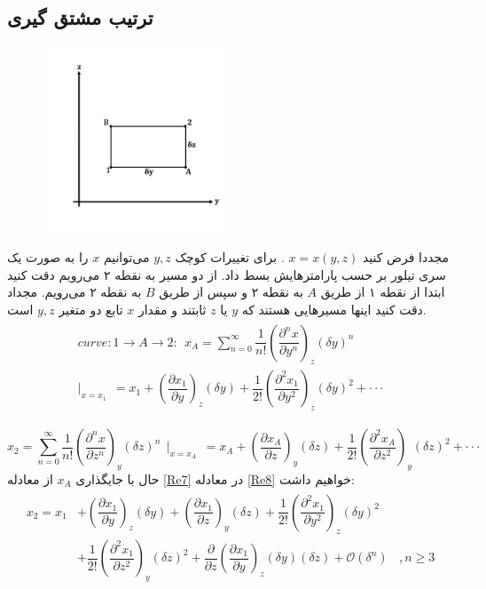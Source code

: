 \documentclass[12pt,a4paper]{article}							   %
\begin{document}
\subsection{ترتیب مشتق گیری
}
\begin{figure}
\label{wrap-fig:1}
\includegraphics[width=5.5cm]{Im2}
\end{figure}
مجددا فرض کنید
$ x=x(y,z) $
. برای تغییرات کوچک
$ y, z $
می‌توانیم
$ x $
را به صورت یک سری تیلور بر حسب پارامترهایش بسط داد.
از دو مسیر به نقطه ۲ می‌رویم دقت کنید ابتدا از نقطه ۱ از طریق
$ A $
به نقطه ۲ و سپس از طریق
$ B $
به نقطه ۲ می‌رویم. مجداد دقت کنید اینها مسیرهایی هستند که
$ y $
یا
$ z $
ثابتند و مقدار
$ x $
تابع دو متغیر
$ y,z$
است.
\begin{align}\label{Re7}
\begin{split}
curve:1\rightarrow A\rightarrow 2 : ~ ~ x_{A}=\sum_{n=0}^{\infty}\dfrac{1}{n!}\left( \dfrac{\partial^{n}x}{\partial y^{n}}\right)_{z}(\delta y)^{n}\\
\vert_{x=x_{1}} ~~= x_{1}+\left( \dfrac{\partial x_{1}}{\partial y}\right)_{z}(\delta y)+\dfrac{1}{2!}\left( \dfrac{\partial^{2}x_{1}}{\partial y^{2}}\right)_{z}(\delta y)^{2}+\cdot \cdot \cdot
\end{split}
\end{align}
\par
\begin{equation}\label{Re8}
x_{2}=\sum_{n=0}^{\infty}\dfrac{1}{n!}\left( \dfrac{\partial^{n}x}{\partial z^{n}}\right)_{y}(\delta z)^{n}
~~\vert_{x=x_{A}} ~~=x_{A}+\left( \dfrac{\partial x_{A}}{\partial z}\right)_{y}(\delta z)+\dfrac{1}{2!}\left( \dfrac{\partial^{2}x_{A}}{\partial z^{2}}\right)_{y}(\delta z)^{2}+\cdot \cdot \cdot 
\end{equation}
حال با جایگذاری
$ x_{A} $
از معادله
\eqref{Re7}
در معادله
\eqref{Re8}
خواهیم داشت:
\begin{align}\label{Re9}
\begin{split}
x_{2}=x_{1}&+\left( \dfrac{\partial x_{1}}{\partial y}\right)_{z}(\delta y)+\left( \dfrac{\partial x_{1}}{\partial z}\right)_{y}(\delta z)+\dfrac{1}{2!}\left( \dfrac{\partial^{2}x_{1}}{\partial y^{2}}\right)_{z}(\delta y)^{2}\\
	       &+\dfrac{1}{2!}\left(\dfrac{\partial^{2}x_{1}}{\partial z^{2}}\right)_{y}(\delta z)^{2}+					\dfrac{\partial}{\partial z}\left( \dfrac{\partial x_{1}}{\partial y}\right)_{z}(\delta y)(\delta z)+\mathcal{O}(\delta ^{n})~~~~,n\geq 3
\end{split}
\end{align}
\end{document}
